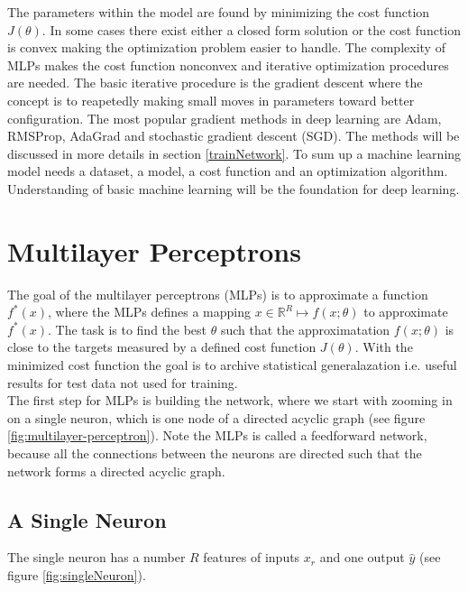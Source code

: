 The parameters within the model are found by minimizing the cost function $J(\theta)$. In some cases there exist either a closed form solution or the cost function is convex making the optimization problem easier to handle. The complexity of MLPs makes the cost function nonconvex and iterative optimization procedures are needed. The basic iterative procedure is the gradient descent where the concept is to reapetedly making small moves in parameters toward better configuration. The most popular gradient methods in deep learning are Adam, RMSProp, AdaGrad and stochastic gradient descent (SGD). The methods will be discussed in more details in section \ref{trainNetwork}. To sum up a machine learning model needs a dataset, a model, a cost function and an optimization algorithm. Understanding of basic machine learning will be the foundation for deep learning.



\section{Multilayer Perceptrons}\label{multilayerPerceptron}
The goal of the multilayer perceptrons (MLPs) is to approximate a function $f^*(x)$, where the MLPs defines a mapping $x\in \mathbb{R}^R \mapsto f(x;\theta)$ to approximate $f^*(x)$. The task is to find the best $\theta$ such that the approximatation $f(x;\theta)$ is close to the targets measured by a defined cost function $J(\theta)$. With the minimized cost function the goal is to archive statistical generalazation i.e. useful results for test data not used for training. \\

The first step for MLPs is building the network, where we start with zooming in on a single neuron, which is one node of a directed acyclic graph (see figure \ref{fig:multilayer-perceptron}). Note the MLPs is called a feedforward network, because all the connections between the neurons are directed such that the network forms a directed acyclic graph.

\subsection{A Single Neuron}\label{singleNeuron}
The single neuron has a number $R$ features of inputs $x_r$ and one output $\hat{y}$ (see figure \ref{fig:singleNeuron}). 

